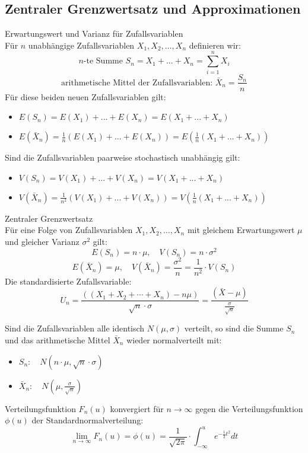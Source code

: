 \subsection{Zentraler Grenzwertsatz und Approximationen}

\begin{corollary}{Erwartungswert und Varianz für Zufallsvariablen}\\
Für $n$ unabhängige Zufallsvariablen $X_1, X_2, \ldots, X_n$ definieren wir:
$$n\text{-te Summe } S_n = X_1 + ... + X_n = \sum_{i=1}^n X_i$$
$$\text{arithmetische Mittel der Zufallsvariablen: } \bar{X}_n = \frac{S_n}{n}$$
Für diese beiden neuen Zufallsvariablen gilt:
\begin{itemize}
    \item $E(S_n) = E(X_1) + ... + E(X_n) = E(X_1 + ... + X_n)$
    \item $E(\bar{X}_n) = \frac{1}{n}(E(X_1) + ... + E(X_n)) = E(\frac{1}{n}(X_1 + ... + X_n))$
\end{itemize}
\vspace{1mm}
Sind die Zufallsvariablen paarweise stochastisch unabhängig gilt:
\begin{itemize}
    \item $V(S_n) = V(X_1) + ... + V(X_n) = V(X_1 + ... + X_n)$
    \item $V(\bar{X}_n) = \frac{1}{n^2}(V(X_1) + ... + V(X_n)) = V(\frac{1}{n}(X_1 + ... + X_n))$
\end{itemize}
\end{corollary}

\begin{theorem}{Zentraler Grenzwertsatz}\\
Für eine Folge von Zufallsvariablen $X_1, X_2, \ldots, X_n$ mit gleichem Erwartungswert $\mu$ und gleicher Varianz $\sigma^2$ gilt:
$$
E(S_n)=n \cdot \mu, \quad V(S_n)=n \cdot \sigma^2
$$
$$
E(\bar{X}_n)=\mu, \quad V(\bar{X}_n)=\frac{\sigma^2}{n}=\frac{1}{n^2} \cdot V(S_n)
$$
Die standardisierte Zufallsvariable:
$$
U_n=\frac{((X_1+X_2+\cdots+X_n)-n\mu)}{\sqrt{n} \cdot \sigma}=\frac{(\bar{X}-\mu)}{\frac{\sigma}{\sqrt{n}}}
$$

Sind die Zufallsvariablen alle identisch $N(\mu,\sigma)$ verteilt, so sind die Summe $S_n$ und das arithmetische Mittel $\bar{X}_n$ wieder normalverteilt mit:
\begin{itemize}
  \item $S_n: \quad N(n \cdot \mu, \sqrt{n} \cdot \sigma)$
  \item $\bar{X}_n: \quad N(\mu, \frac{\sigma}{\sqrt{n}})$
\end{itemize}
\vspace{3mm}
Verteilungsfunktion $F_n(u)$ konvergiert für $n \to \infty$ gegen die Verteilungsfunktion $\phi(u)$ der Standardnormalverteilung:
$$
\lim_{n\to\infty} F_n(u) = \phi(u) = \frac{1}{\sqrt{2\pi}} \cdot \int_{-\infty}^u e^{-\frac{1}{2}t^2} dt
$$
\end{theorem}



